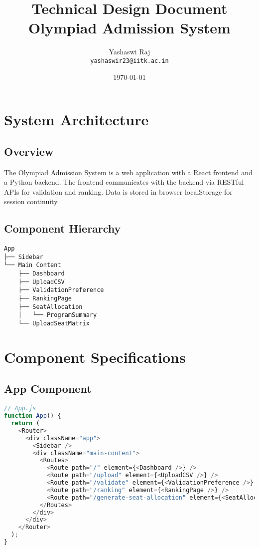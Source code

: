\documentclass[12pt,a4paper]{article}
\title{Technical Design Document\\
       Olympiad Admission System}
\author{Yashaswi Raj\\\texttt{yashaswir23@iitk.ac.in}}
\date{\today}
\begin{document}
\maketitle
\tableofcontents
\newpage

\section{System Architecture}
\subsection{Overview}
The Olympiad Admission System is a web application with a React frontend and a Python backend. The frontend communicates with the backend via RESTful APIs for validation and ranking. Data is stored in browser localStorage for session continuity.

\subsection{Component Hierarchy}
\begin{verbatim}
App
├── Sidebar
└── Main Content
    ├── Dashboard
    ├── UploadCSV
    ├── ValidationPreference
    ├── RankingPage
    ├── SeatAllocation
    │   └── ProgramSummary
    └── UploadSeatMatrix
\end{verbatim}

\section{Component Specifications}

\subsection{App Component}
\begin{lstlisting}[language=JavaScript]
// App.js
function App() {
  return (
    <Router>
      <div className="app">
        <Sidebar />
        <div className="main-content">
          <Routes>
            <Route path="/" element={<Dashboard />} />
            <Route path="/upload" element={<UploadCSV />} />
            <Route path="/validate" element={<ValidationPreference />} />
            <Route path="/ranking" element={<RankingPage />} />
            <Route path="/generate-seat-allocation" element={<SeatAllocation />} />
          </Routes>
        </div>
      </div>
    </Router>
  );
}
\end{lstlisting}
\end{document}
